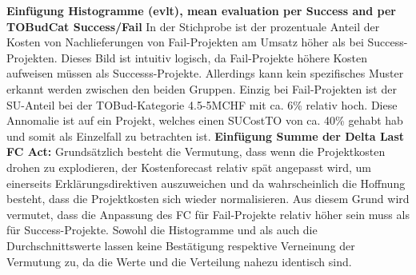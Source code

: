 \newline\textbf{Einfügung Histogramme (evlt), mean evaluation per Success and per TOBudCat Success/Fail}
In der Stichprobe ist der prozentuale Anteil der Kosten von Nachlieferungen von Fail-Projekten am Umsatz höher als bei Success-Projekten. Dieses Bild ist intuitiv logisch, da Fail-Projekte höhere Kosten aufweisen müssen als Successs-Projekte. Allerdings kann kein spezifisches Muster erkannt werden zwischen den beiden Gruppen. Einzig bei Fail-Projekten ist der SU-Anteil bei der TOBud-Kategorie 4.5-5MCHF mit ca. 6\% relativ hoch. Diese Annomalie ist auf ein Projekt, welches einen SUCostTO von ca. 40\% gehabt hab und somit als Einzelfall zu betrachten ist.
\newline\textbf{Einfügung Summe der Delta Last FC Act:}
\newline Grundsätzlich besteht die Vermutung, dass wenn die Projektkosten drohen zu explodieren, der Kostenforecast relativ spät angepasst wird, um einerseits Erklärungsdirektiven auszuweichen und da wahrscheinlich die Hoffnung besteht, dass die Projektkosten sich wieder normalisieren. Aus diesem Grund wird vermutet, dass die Anpassung des FC für Fail-Projekte relativ höher sein muss als für Success-Projekte. Sowohl die Histogramme und als auch die Durchschnittswerte lassen keine Bestätigung respektive Verneinung der Vermutung zu, da die Werte und die Verteilung nahezu identisch sind. 
